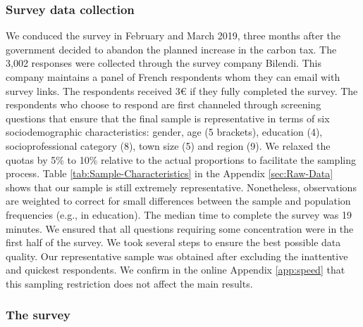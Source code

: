 \documentclass[12pt]{article} %
\begin{document}
\subsubsection{Survey data collection }


We conduced the survey in February and March 2019, three months after the government decided to abandon the planned increase in the carbon tax. The 3,002 responses were collected through the survey company Bilendi. This company maintains a panel of French respondents whom they can email with survey links. The respondents received 3\euro{} if they fully completed the survey. The respondents who choose to respond are first channeled through screening questions that ensure that the final sample is representative in terms of six sociodemographic characteristics: gender, age (5 brackets), education (4), socioprofessional category (8), town size (5) and region (9). We relaxed the quotas by 5\% to 10\% relative to the actual proportions to facilitate the sampling process. Table \ref{tab:Sample-Characteristics} in the Appendix \ref{sec:Raw-Data} shows that our sample is still extremely representative. Nonetheless, observations are weighted to correct for small differences between the sample and population frequencies (e.g., in education). The median time to complete the survey was 19 minutes. We ensured that all questions requiring some concentration were in the first half of the survey. We took several steps to ensure the best possible data quality. Our representative sample was obtained after excluding the inattentive and quickest respondents. We confirm in the online Appendix \ref{app:speed} that this sampling restriction does not affect the main results. %

\subsubsection{The survey \label{subsubsec:the-survey}}
\end{document}
